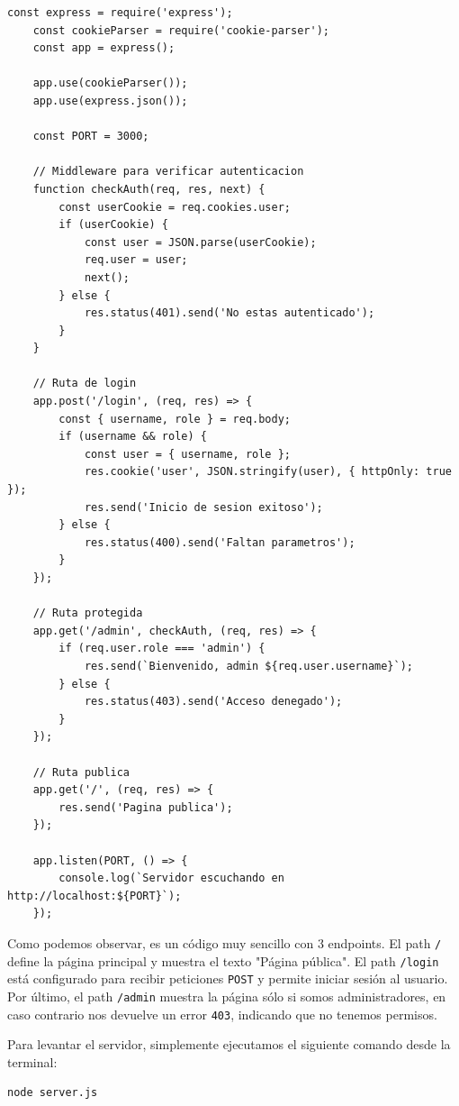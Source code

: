 \begin{lstlisting}[style=Js]
    const express = require('express');
    const cookieParser = require('cookie-parser');
    const app = express();
    
    app.use(cookieParser());
    app.use(express.json());
    
    const PORT = 3000;
    
    // Middleware para verificar autenticacion
    function checkAuth(req, res, next) {
        const userCookie = req.cookies.user;
        if (userCookie) {
            const user = JSON.parse(userCookie);
            req.user = user;
            next();
        } else {
            res.status(401).send('No estas autenticado');
        }
    }
    
    // Ruta de login
    app.post('/login', (req, res) => {
        const { username, role } = req.body;
        if (username && role) {
            const user = { username, role };
            res.cookie('user', JSON.stringify(user), { httpOnly: true });
            res.send('Inicio de sesion exitoso');
        } else {
            res.status(400).send('Faltan parametros');
        }
    });
    
    // Ruta protegida
    app.get('/admin', checkAuth, (req, res) => {
        if (req.user.role === 'admin') {
            res.send(`Bienvenido, admin ${req.user.username}`);
        } else {
            res.status(403).send('Acceso denegado');
        }
    });
    
    // Ruta publica
    app.get('/', (req, res) => {
        res.send('Pagina publica');
    });
    
    app.listen(PORT, () => {
        console.log(`Servidor escuchando en http://localhost:${PORT}`);
    });
\end{lstlisting}

Como podemos observar, es un código muy sencillo con 3 endpoints. El path \texttt{/} define la página principal y muestra el texto "Página pública". El path \texttt{/login} está configurado para recibir peticiones \texttt{POST} y permite iniciar sesión al usuario. Por último, el path \texttt{/admin} muestra la página sólo si somos administradores, en caso contrario nos devuelve un error \texttt{403}, indicando que no tenemos permisos.

Para levantar el servidor, simplemente ejecutamos el siguiente comando desde la terminal:

\begin{lstlisting}[style=Consola]
    node server.js
\end{lstlisting}

